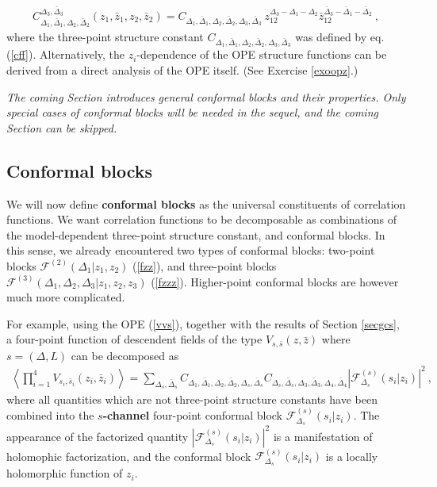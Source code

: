 \documentclass[12pt,a4paper,notitlepage]{report}
\newcommand \la {\left\langle}
\newcommand \ra {\right\rangle}
\numberwithin{equation}{section}
\theoremstyle{break}
\begin{document}
\begin{align}
 \boxed{C_{\Delta_1,\bar{\Delta}_1,\Delta_2,\bar{\Delta}_2}^{\Delta_3,\bar{\Delta}_3}(z_1,\bar{z}_1,z_2,\bar{z}_2) = C_{\Delta_1,\bar{\Delta}_1,\Delta_2,\bar{\Delta}_2,\Delta_3,\bar{\Delta}_3}\ z_{12}^{\Delta_3-\Delta_1-\Delta_2}  \bar{z}_{12}^{\bar{\Delta}_3-\bar{\Delta}_1-\bar{\Delta}_2}}\ ,
\label{ccz}
\end{align}
where the three-point structure constant $C_{\Delta_1,\bar{\Delta}_1,\Delta_2,\bar{\Delta}_2,\Delta_3,\bar{\Delta}_3}$ was defined by eq. (\ref{cff}). Alternatively, the $z_i$-dependence of the OPE structure functions can be derived from a direct analysis of the OPE itself. (See Exercise \ref{exoopz}.)

\vspace{2mm} 

\textit{The coming Section introduces general conformal blocks and their properties. Only special cases of conformal blocks will be needed in the sequel, and the coming Section can be skipped.}

\subsection{Conformal blocks \label{secaco}}

We will now define \textbf{\boldmath conformal blocks} as the universal constituents of correlation functions. 
We want correlation functions to be decomposable as combinations of the model-dependent three-point structure constant, and conformal blocks. In this sense, we already encountered two types of conformal blocks: two-point blocks $\mathcal{F}^{(2)}(\Delta_1|z_1,z_2)$ (\ref{fzz}), and three-point blocks $\mathcal{F}^{(3)}(\Delta_1,\Delta_2,\Delta_3|z_1,z_2,z_3)$ (\ref{fzzz}). Higher-point conformal blocks are however much more complicated.

For example, using the OPE (\ref{vvs}), together with the results of Section \ref{secgcs}, a four-point function of descendent fields of the type $V_{s,\bar{s}}(z,\bar{z})$ where $s=(\Delta,L)$ can be decomposed as 
\begin{align}
 \la \prod_{i=1}^4 V_{s_i,\bar{s}_i}(z_i,\bar{z}_i)\ra = \sum_{\Delta_s,\bar{\Delta}_s} C_{\Delta_1,\bar{\Delta}_1,\Delta_2,\bar{\Delta}_2,\Delta_s,\bar{\Delta}_s} C_{\Delta_s,\bar{\Delta}_s,\Delta_3,\bar{\Delta}_3,\Delta_4,\bar{\Delta}_4} \left| \mathcal{F}^{(s)}_{\Delta_s}(s_i|z_i)\right|^2\ ,
\label{fsd}
\end{align}
where all quantities which are not three-point structure constants have been combined into the \textbf{\boldmath $s$-channel} four-point conformal block $\mathcal{F}^{(s)}_{\Delta_s}(s_i|z_i)$.  The appearance of the factorized quantity $\left| \mathcal{F}^{(s)}_{\Delta_s}(s_i|z_i)\right|^2$ is a manifestation of holomophic factorization, and the conformal block $\mathcal{F}^{(s)}_{\Delta_s}(s_i|z_i)$ is a locally holomorphic function of $z_i$. 
\end{document}
